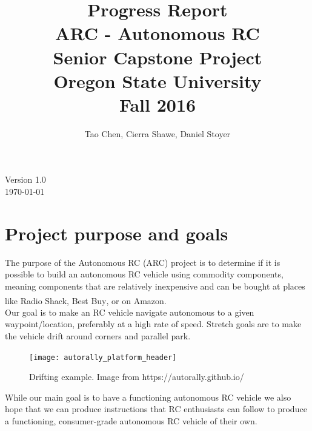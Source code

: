 \documentclass[compsoc,draftclsnofoot,onecolumn,10pt]{IEEEtran}
\date{}
\begin{document}
\begin{titlepage}
\title{
Progress Report\\
\LARGE
ARC - Autonomous RC\\
Senior Capstone Project\\
Oregon State University\\
Fall 2016
}
\author{Tao Chen, Cierra Shawe, Daniel Stoyer}
\maketitle
\begin{center}
	Version 1.0\\
	\today
\end{center}

\thispagestyle{empty} %
	
\end{titlepage}

\tableofcontents

\newpage

\section{Project purpose and goals} 
The purpose of the Autonomous RC (ARC) project is to determine if it is possible
to build an autonomous RC vehicle using commodity components, meaning components
that are relatively inexpensive and can be bought at places like Radio
Shack\textsuperscript{\textregistered}, Best Buy\textsuperscript{\textregistered}, or on Amazon. \\
Our goal is to make an RC vehicle navigate autonomous to a given
waypoint/location, preferably at a high rate of speed. Stretch goals are to
make the vehicle drift around corners and parallel park.\\

\begin{figure}[H]
   	\texttt{[image: autorally\_platform\_header]}
    \caption{Drifting example. Image from https://autorally.github.io/}
\end{figure}

While our main goal is to have a functioning autonomous RC vehicle we also hope
that we can produce instructions that RC enthusiasts can follow to produce a
functioning, consumer-grade autonomous RC vehicle of their own.
\end{document}
